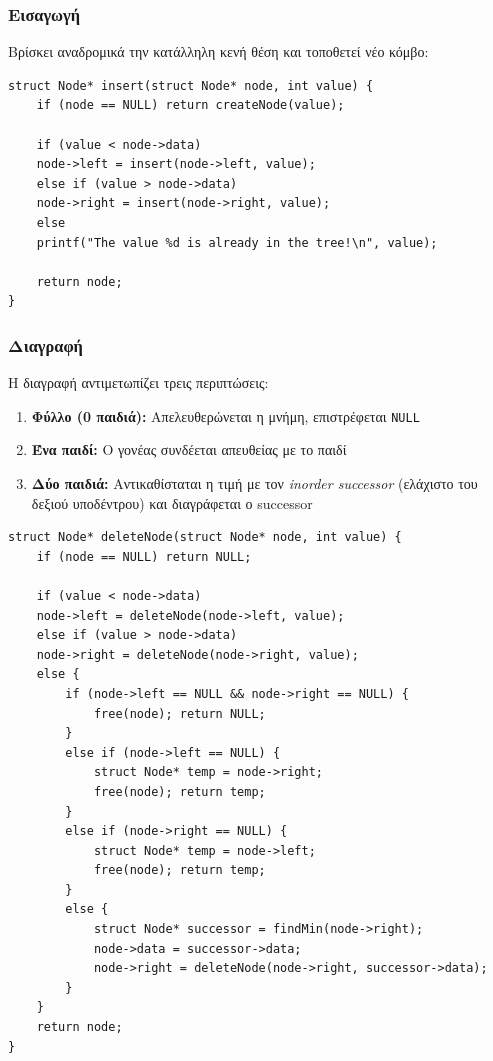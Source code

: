 \documentclass[a4paper,12pt]{article}
\begin{document}
	\subsubsection{Εισαγωγή}
	Βρίσκει αναδρομικά την κατάλληλη κενή θέση και τοποθετεί νέο κόμβο:
	
	\begin{lstlisting}
struct Node* insert(struct Node* node, int value) {
	if (node == NULL) return createNode(value);
	
	if (value < node->data)
	node->left = insert(node->left, value);
	else if (value > node->data)
	node->right = insert(node->right, value);
	else
	printf("The value %d is already in the tree!\n", value);
	
	return node;
}
	\end{lstlisting}
	
	\subsubsection{Διαγραφή}
	Η διαγραφή αντιμετωπίζει τρεις περιπτώσεις:
	
	\begin{enumerate}
		\item \textbf{Φύλλο (0 παιδιά):} Απελευθερώνεται η μνήμη, επιστρέφεται \texttt{NULL}
		\item \textbf{Ένα παιδί:} Ο γονέας συνδέεται απευθείας με το παιδί
		\item \textbf{Δύο παιδιά:} Αντικαθίσταται η τιμή με τον \textit{inorder successor} 
		(ελάχιστο του δεξιού υποδέντρου) και διαγράφεται ο successor
	\end{enumerate}
	
	\begin{lstlisting}
struct Node* deleteNode(struct Node* node, int value) {
	if (node == NULL) return NULL;
	
	if (value < node->data)
	node->left = deleteNode(node->left, value);
	else if (value > node->data)
	node->right = deleteNode(node->right, value);
	else {
		if (node->left == NULL && node->right == NULL) {
			free(node); return NULL;
		}
		else if (node->left == NULL) {
			struct Node* temp = node->right;
			free(node); return temp;
		}
		else if (node->right == NULL) {
			struct Node* temp = node->left;
			free(node); return temp;
		}
		else {
			struct Node* successor = findMin(node->right);
			node->data = successor->data;
			node->right = deleteNode(node->right, successor->data);
		}
	}
	return node;
}
	\end{lstlisting}
	
\end{document}
